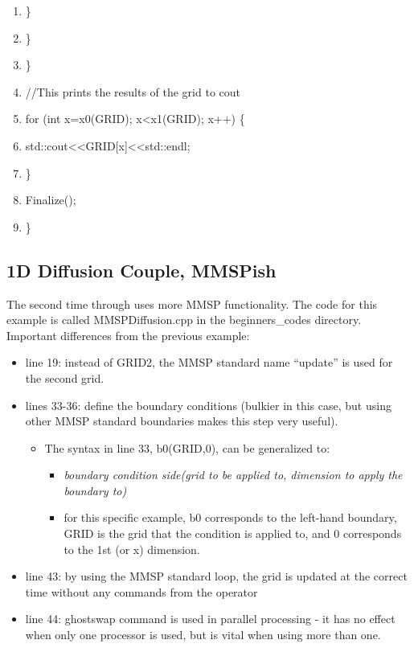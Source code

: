 \documentclass{article}
\begin{document}
\begin{shadebox}
\begin{enumerate}
\item \hspace{10pt} \hspace{10pt}                 \}
\item \hspace{10pt}         \}
\item \}
\item //This prints the results of the grid to cout
\item for (int x=x0(GRID); x\textless x1(GRID); x++) \{
\item \hspace{10pt}         std::cout\textless \textless GRID[x]\textless \textless std::endl;
\item \}
\item Finalize();
\item \}
\end{enumerate}

\end{shadebox}

\subsection{1D Diffusion Couple, MMSPish}
The second time through uses more MMSP functionality. The code for this example is called MMSPDiffusion.cpp in the beginners_codes directory. Important differences from the previous example:

\begin{itemize} \itemsep1pt \parskip0pt 
\item line 19: instead of GRID2, the MMSP standard name “update” is used for the second grid.
\item lines 33-36: define the boundary conditions (bulkier in this case, but using other MMSP standard boundaries makes this step very useful).
\begin{itemize} \itemsep1pt \parskip0pt 
\item The syntax in line 33, b0(GRID,0), can be generalized to:
\begin{itemize} \itemsep1pt \parskip0pt 
\item \textit{boundary condition side(grid to be applied to, dimension to apply the boundary to)}
\item for this specific example, b0 corresponds to the left-hand boundary, GRID is the grid that the condition is applied to, and 0 corresponds to the 1st (or x) dimension.
\end {itemize}
\end {itemize}
\item line 43: by using the MMSP standard loop, the grid is updated at the correct time without any commands from the operator
\item line 44: ghostswap command is used in parallel processing - it has no effect when only one processor is used, but is vital when using more than one.
\end {itemize}
\end{document}
